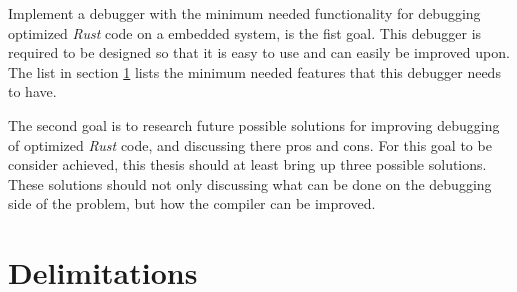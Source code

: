 Implement a debugger with the minimum needed functionality for debugging optimized \emph{Rust} code on a embedded system, is the fist goal.
This debugger is required to be designed so that it is easy to use and can easily be improved upon.
The list in section \ref{sec:delimitations} lists the minimum needed features that this debugger needs to have.


The second goal is to research future possible solutions for improving debugging of optimized \emph{Rust} code, and discussing there pros and cons.
For this goal to be consider achieved, this thesis should at least bring up three possible solutions.
These solutions should not only discussing what can be done on the debugging side of the problem, but how the compiler can be improved.









\section{Delimitations}
\label{sec:delimitations}


